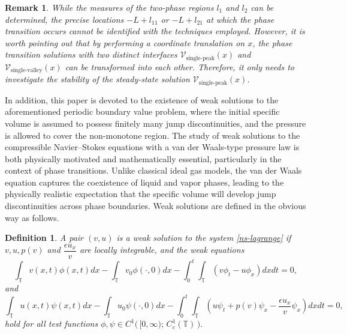 \documentclass[a4paper,oneside,11pt]{article}
\numberwithin{equation}{section}
\newtheorem{definition}{Definition}[section]
\newtheorem{remark}{Remark}[section]
\begin{document}
\begin{remark}
While the measures of the two-phase regions $l_1$ and $l_2$ can be determined, the precise locations $-L+l_{11}$ or $-L+l_{21}$ at which the phase transition occurs cannot be identified with the techniques employed. However, it is worth pointing out that by performing a coordinate translation on $x$, the phase transition solutions with two distinct interfaces $\mathscr{V}_{\mathrm{single\text{-}peak}}(x)$ and $\mathscr{V}_{\mathrm{single\text{-}valley}}(x)$ can be transformed into each other. Therefore, it only needs to investigate the stability of the steady-state solution $\mathscr{V}_{\mathrm{single\text{-}peak}}(x)$. 
\end{remark}


In addition, this paper is devoted to the existence of weak solutions to the aforementioned periodic boundary value problem, where the initial specific volume is assumed to possess finitely many jump discontinuities, and the pressure is allowed to cover the non-monotone region. 
The study of weak solutions to the compressible Navier–Stokes equations with a van der Waals-type pressure law is both physically motivated and mathematically essential, particularly in the context of phase transitions. Unlike classical ideal gas models, the van der Waals equation captures the coexistence of liquid and vapor phases, leading to the physically realistic expectation that the specific volume will develop jump discontinuities across phase boundaries. 
Weak solutions are defined in the obvious way as follows.
\begin{definition}\label{def:weak}
	A pair \((v,u)\) is a weak solution to the system \eqref{ns-lagrange} if $v, u, p(v)$ and $\dfrac{\epsilon u_x}{v}$ are locally integrable, and the weak equations 
	\[
	\int_\mathbb{T} v(x,t)\phi(x,t)dx-\int_\mathbb{T} v_0\phi(\cdot,0)dx-\int_0^t\int_\mathbb{T} \left( v\phi_t - u\phi_x \right)dx dt = 0,
	\]
	and
	\[
	\int_\mathbb{T} u(x,t)\psi(x,t)dx- \int_\mathbb{T} u_0\psi(\cdot,0)dx -\int_0^t\int_\mathbb{T} \left( u\psi_t +p(v)\psi_x - \frac{\epsilon u_x}{v}\psi_x \right)dx dt  = 0,
	\]
hold for all test functions $\phi,\psi\in C^{1}\bigl(\,[0,\infty);\,C_{c}^{1}(\mathbb{T})\,\bigr).$
\end{definition}




\end{document}
